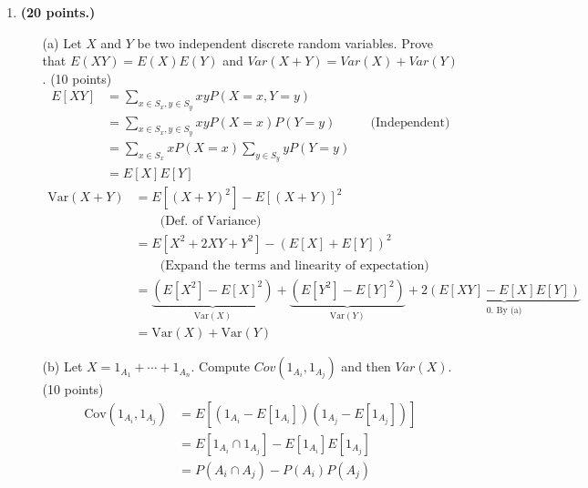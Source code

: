 \begin{enumerate}
    \item \textbf{(20 points.)}
    \begin{itemize}
        \item[(a)] Let $X$ and $Y$ be two independent discrete random variables. Prove that $E(XY)=E(X)E(Y)$ and $Var(X+Y)=Var(X)+Var(Y)$. (10 points)\\
        \begin{equation*}
          \begin{aligned}
              E[XY] &= \sum_{x \in S_x, y \in S_y}xy P(X = x, Y = y) 
                 \\ &= \sum_{x \in S_x, y \in S_y}xy P(X = x)P (Y = y) && \text{(Independent)} 
                 \\ & = \sum_{x \in S_x}xP(X = x) \sum_{y\in S_y}y P(Y = y) 
                 \\ & = E[X] E[Y]  
          \end{aligned}  
        \end{equation*} 
        \begin{equation*}
            \begin{aligned}
                \text{Var}(X+Y) &= E[(X+Y)^2] - E[(X+Y)]^2 
                            \\  & \qquad \text{(Def. of Variance)}
                            \\  &= E[X^2 +2XY  +Y^2] - (E[X] + E[Y])^2 
                            \\ & \qquad \text{(Expand the terms and linearity of expectation)}  
                            \\ &= \underbrace{(E[X^2] - E[X]^2)}_{\text{Var}(X) } + \underbrace{(E[Y^2] -E[Y]^2)}_{\text{Var}(Y) } + 2\underbrace{(E[XY] - E[X]E[Y])}_{0\text{. By (a)} }
                            \\ & = \text{Var} (X) + \text{Var}(Y) 
            \end{aligned}
        \end{equation*}
        \item[(b)] Let $X=1_{A_{1}}+\cdots + 1_{A_{n}}$. Compute $Cov(1_{A_{i}},1_{A_{j}})$ and then $Var(X)$. (10 points)
        \begin{equation*}
            \begin{aligned}
                \text{Cov}(1_{A_{i} } , 1_{A_{j} } ) &= E[(1_{A_{i} } - E[1_{A_{i}}] ) (1_{A_{j} } -E[1_{A_{j} } ]) ]
                    \\ &= E[ 1_{A_{i} } \cap 1_{A_{j} } ] - E[1_{A_{i} }]E[ 1_{A_{j} } ]
                    \\ &= P(A_i \cap A_{j} ) - P(A_{i} )P(A_{j} ) 

\end{aligned}
\end{equation*}
\end{itemize}
\end{enumerate}
